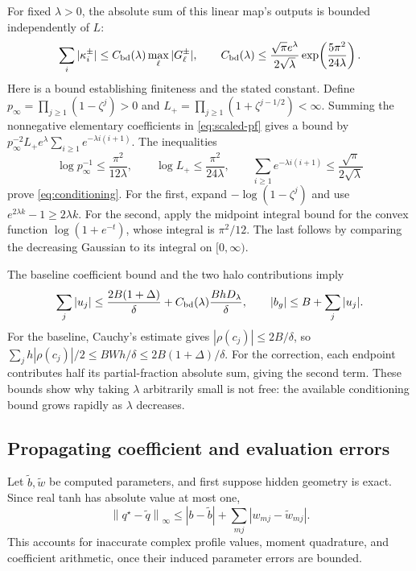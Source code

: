 \documentclass[11pt]{article}
\newcommand{\norm}[1]{\left\lVert#1\right\rVert}
\begin{document}
For fixed $\lambda>0$, the absolute sum of this linear map's outputs is bounded independently of $L$:
\begin{equation}
 \sum_i|\kappa_i^\pm|\le C_{\rm bd}(\lambda)\max_\ell|G_\ell^\pm|,
 \qquad
 C_{\rm bd}(\lambda)\le
 \frac{\sqrt\pi e^\lambda}{2\sqrt\lambda}
 \exp\!\left(\frac{5\pi^2}{24\lambda}\right).
 \label{eq:conditioning}
\end{equation}
Here is a bound establishing finiteness and the stated constant. Define
$p_\infty=\prod_{j\ge1}(1-\zeta^j)>0$ and
$L_+=\prod_{j\ge1}(1+\zeta^{j-1/2})<\infty$. Summing the nonnegative elementary coefficients in \eqref{eq:scaled-pf} gives a bound by
$p_\infty^{-2}L_+e^\lambda\sum_{i\ge1}e^{-\lambda i(i+1)}$. The inequalities
\[
 \log p_\infty^{-1}\le\frac{\pi^2}{12\lambda},\qquad
 \log L_+\le\frac{\pi^2}{24\lambda},\qquad
 \sum_{i\ge1}e^{-\lambda i(i+1)}\le\frac{\sqrt\pi}{2\sqrt\lambda}
\]
prove \eqref{eq:conditioning}. For the first, expand $-\log(1-\zeta^j)$ and use $e^{2\lambda k}-1\ge2\lambda k$. For the second, apply the midpoint integral bound for the convex function $\log(1+e^{-t})$, whose integral is $\pi^2/12$. The last follows by comparing the decreasing Gaussian to its integral on $[0,\infty)$.

The baseline coefficient bound and the two halo contributions imply
\begin{equation}
 \sum_j|u_j|\le\frac{2B(1+\Delta)}\delta+
 C_{\rm bd}(\lambda)\frac{BhD_\lambda}{\delta},\qquad
 |b_g|\le B+\sum_j|u_j|.
 \label{eq:l1-bound}
\end{equation}
For the baseline, Cauchy's estimate gives $|\rho(c_j)|\le2B/\delta$, so
$\sum_j h|\rho(c_j)|/2\le BWh/\delta\le2B(1+\Delta)/\delta$.
For the correction, each endpoint contributes half its partial-fraction absolute sum, giving the second term. These bounds show why taking $\lambda$ arbitrarily small is not free: the available conditioning bound grows rapidly as $\lambda$ decreases.

\subsection{Propagating coefficient and evaluation errors}

Let $\widetilde b,\widetilde w$ be computed parameters, and first suppose hidden geometry is exact. Since real tanh has absolute value at most one,
\begin{equation}
 \norm{q^\star-\widetilde q}_\infty
 \le|b-\widetilde b|+\sum_{mj}|w_{mj}-\widetilde w_{mj}|.
 \label{eq:coefficient-error}
\end{equation}
This accounts for inaccurate complex profile values, moment quadrature, and coefficient arithmetic, once their induced parameter errors are bounded.
\end{document}

